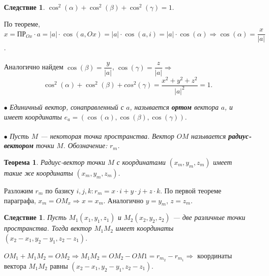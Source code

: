 \newtheorem*{cor2_3_2}{Следствие}\begin{cor2_3_2}$\cos^2(\alpha) + \cos^2(\beta) + \cos^2(\gamma) = 1.$
\end{cor2_3_2}\begin{Proof}
	По теореме, $x = \text{ПР}_{Ox}\cdot a = |a|\cdot \cos(a, Ox) = |a|\cdot \cos(a, i) = |a|\cdot \cos(\alpha)\Rightarrow \cos(\alpha) = \dfrac{x}{|a|}$.\\\\
	Аналогично найдем $\cos(\beta) = \dfrac{y}{|a|}$, $\cos(\gamma) = \dfrac{z}{|a|}\Rightarrow$ $$\cos^2(\alpha) + \cos^2(\beta) + cos^2(\gamma) = \dfrac{x^2 + y^2 + z^2}{|a|^2} = 1.$$
\end{Proof}
$\bullet$ \textit{Единичный вектор, сонаправленный с $a$, называется \textbf{ортом} вектора $a$, и имеет
	координаты $e_a = (\cos(\alpha), \cos(\beta), \cos(\gamma))$}.\\\\
$\bullet$ \textit{Пусть $M$ --- некоторая точка пространства. Вектор $OM$ называется \textbf{радиус-вектором} точки $M$.
	Обозначение: $r_m$.}
\newtheorem*{th2_3_2}{Теорема}\begin{th2_3_2}Радиус-вектор точки $M$ с координатами $(x_m, y_m, z_m)$ имеет такие же координаты $(x_m, y_m, z_m)$.
\end{th2_3_2}\begin{Proof}
	Разложим $r_m$ по базису $i, j, k: r_m = x\cdot i + y\cdot j + z\cdot k$. По первой теореме параграфа, $x_m = OM_x\Rightarrow x = x_m$. Аналогично $y = y_m$, $z = z_m$. 
\end{Proof}
\newtheorem*{cor2_3_3}{Следствие}\begin{cor2_3_3}Пусть $M_1(x_1, y_1, z_1)$ и $M_2(x_2, y_2, z_2)$ --- две различные точки пространства. Тогда вектор $M_1M_2$ имеет координаты $(x_2 - x_1, y_2 - y_1, z_2 - z_1)$.
\end{cor2_3_3}\begin{Proof}
	$OM_1 + M_1M_2 = OM_2\Rightarrow M_1 M_2 = OM_2 - OM1 = r_{m_2} - r_{m_1}\Rightarrow$ координаты вектора $M_1M_2$ равны $(x_2 - x_1, y_2 - y_1, z_2 - z_1)$.
\end{Proof}







